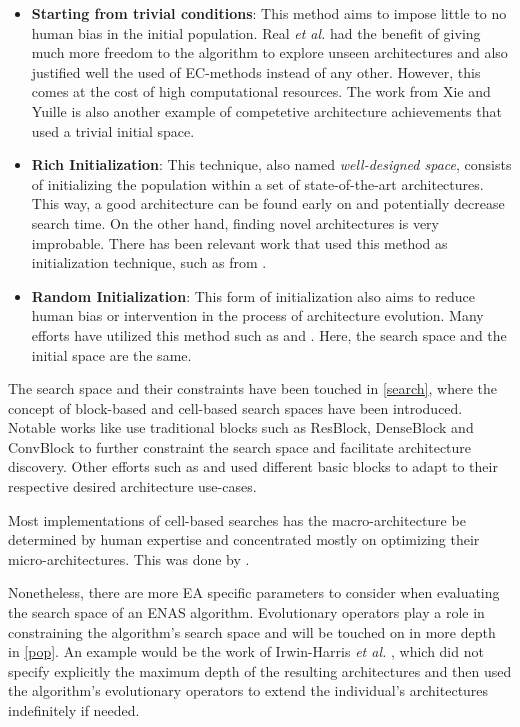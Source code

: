 \documentclass[10pt,        %
               a4paper,     %
               journal,     %
               ]{IEEEtran}
\begin{document}
\begin{itemize}
    \item \textbf{Starting from trivial conditions}: This method aims to impose little to no human bias in the initial
     population. Real \textit{et al.} \cite{pmlr-v70-real17a} had the benefit of giving much more freedom to the algorithm
     to explore unseen architectures and also justified well the used of EC-methods instead of any other.
     However, this comes at the cost of high computational resources. The work from Xie and Yuille \cite{xie2017genetic} is
     also another example of competetive architecture achievements that used a trivial initial space.

    \item \textbf{Rich Initialization}: This technique, also named \textit{well-designed space}, consists of initializing
    the population within a set of state-of-the-art architectures. This way, a good architecture can be found early on
    and potentially decrease search time. On the other hand, finding novel architectures is very improbable. There has been
    relevant work that used this method as initialization technique, such as from \cite{fujino2017deep}.

    \item \textbf{Random Initialization}: This form of initialization also aims to reduce human bias or intervention in
     the process of architecture evolution. Many efforts have utilized this method such as \cite{sun2019evolving} and
     \cite{sun2019completely}. Here, the search space and the initial space are the same.
\end{itemize}

The search space and their constraints have been touched in \ref{search}, where the concept of block-based and cell-based
search spaces have been introduced. Notable works like \cite{sun2019completely} use traditional blocks such as ResBlock, DenseBlock
and ConvBlock to further constraint the search space and facilitate architecture discovery. Other efforts such as
\cite{chen2019auto} and \cite{song2020efficient} used different basic blocks to adapt to their respective desired architecture
use-cases.

Most implementations of cell-based searches has the macro-architecture be determined by human expertise and concentrated mostly
on optimizing their micro-architectures. This was done by \cite{real2019regularized}.

Nonetheless, there are more EA specific
parameters to consider when evaluating the search space of an ENAS algorithm. Evolutionary operators play a role in
constraining the algorithm's search space and will be touched on in more depth in \ref{pop}. An example would be the
work of Irwin-Harris \textit{et al.} \cite{irwin2019graph}, which did not specify explicitly the maximum depth of the
resulting architectures and then used the algorithm's evolutionary operators to extend the individual's architectures
indefinitely if needed.
\end{document}

